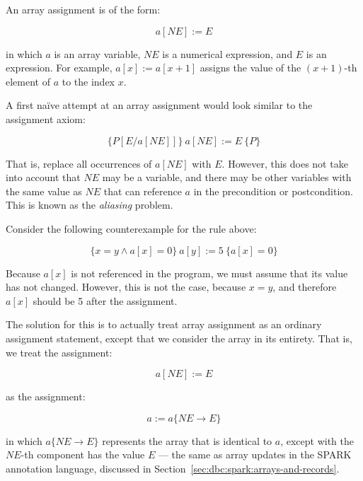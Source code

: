 An array assignment is of the form:

\begin{displaymath}
  a[NE] := E
\end{displaymath}

in which $a$ is an array variable, $NE$ is a numerical expression, and $E$ is an expression. For example, $a[x] := a[x+1]$ assigns the value of the $(x+1)$-th element of $a$ to the index $x$.

A first na\"ive attempt at an array assignment would look similar to the assignment axiom:

\begin{displaymath}
  \{P[E/a[NE]]\}~a[NE] := E~ \{P\} 
\end{displaymath}

That is, replace all occurrences of $a[NE]$ with $E$. However, this does not take into account that $NE$ may be a variable, and there may be other variables with the same value as $NE$ that can reference $a$ in the precondition or postcondition. This is known as the \emph{aliasing} problem.

\begin{example}
Consider the following counterexample for the rule above:

\begin{displaymath}
  \{ x = y \land a[x] = 0\}  ~a[y] := 5~ \{ a[x] = 0\}
\end{displaymath}

Because $a[x]$ is not referenced in the program, we must assume that its value has not changed.  However, this is not the case, because $x=y$, and therefore $a[x]$ should be 5 after the assignment.

\end{example}

The solution for this is to actually treat array assignment as an ordinary assignment statement, except that we consider the array in its entirety. That is, we treat the assignment:

\begin{displaymath}
  a[NE] := E
\end{displaymath}

as the assignment:

\begin{displaymath}
  a := a\{NE \rightarrow E\}
\end{displaymath}

in which $a\{NE \rightarrow E\}$ represents the array that is identical to $a$, except with the $NE$-th component has the value $E$ --- the same as array updates in the SPARK annotation language, discussed in Section~\ref{sec:dbc:spark:arrays-and-records}.

